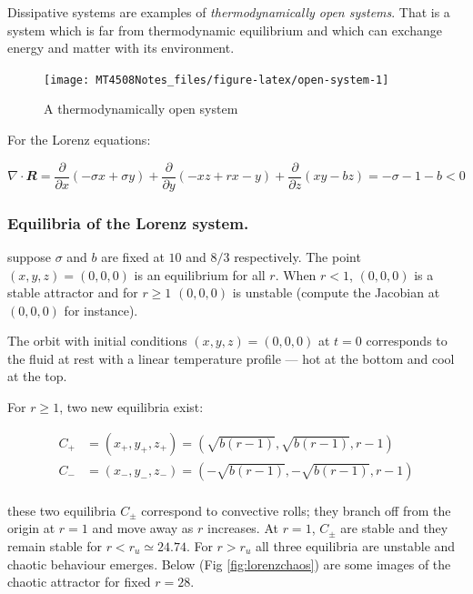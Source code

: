 \documentclass[
  a4paper,
  oneside,
  final]{krantz}
\renewcommand{\v}[1]{{\mathbfit{#1}}}
\newcommand{\pder}[2]{\dfrac{\partial #1}{\partial#2}}
\theoremstyle{definition}
\theoremstyle{definition}
\theoremstyle{definition}
\theoremstyle{definition}
\theoremstyle{remark}
\begin{document}
Dissipative systems are examples of \emph{thermodynamically open systems}. That is a system which is far from thermodynamic equilibrium and which can exchange energy and matter with its environment.

\begin{figure}

{\centering \texttt{[image: MT4508Notes\_files/figure-latex/open-system-1]} 

}

\caption{A thermodynamically open system}\label{fig:open-system}
\end{figure}

For the Lorenz equations:

\[ \nabla \cdot \v{R} = \pder{}{x}(-\sigma x + \sigma y) + \pder{}{y}(-xz + rx -y) + \pder{}{z}(xy -bz) = -\sigma -1 -b <0\]

\hypertarget{equilibria-of-the-lorenz-system.}{%
\subsubsection*{Equilibria of the Lorenz system.}\label{equilibria-of-the-lorenz-system.}}


suppose \(\sigma\) and \(b\) are fixed at \(10\) and \(8/3\) respectively. The point \((x,y,z) = (0,0,0)\) is an equilibrium for all \(r\). When \(r<1\), \((0,0,0)\) is a stable attractor and for \(r \ge 1\) \((0,0,0)\) is unstable (compute the Jacobian at \((0,0,0)\) for instance).

The orbit with initial conditions \((x,y,z) = (0,0,0)\) at \(t=0\) corresponds to the fluid at rest with a linear temperature profile --- hot at the bottom and cool at the top.

For \(r\ge 1\), two new equilibria exist:

\begin{align*}
 C_{+} &= (x_{+}, y_{+}, z_{+}) = \left(\sqrt{b(r-1)},\sqrt{b(r-1)}, r-1\right) \\
 C_{-} &= (x_{-}, y_{-}, z_{-}) = \left(-\sqrt{b(r-1)},-\sqrt{b(r-1)}, r-1\right) \\
\end{align*}

these two equilibria \(C_{\pm}\) correspond to convective rolls; they branch off from the origin at \(r=1\) and move away as \(r\) increases. At \(r=1\), \(C_{\pm}\) are stable and they remain stable for \(r< r_u \simeq 24.74\). For \(r> r_u\) all three equilibria are unstable and chaotic behaviour emerges. Below (Fig \ref{fig:lorenzchaos}) are some images of the chaotic attractor for fixed \(r=28\).
\end{document}

